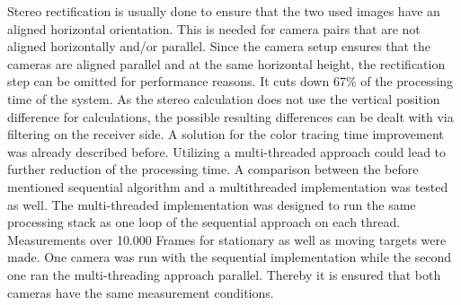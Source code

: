 Stereo rectification is usually done to ensure that the two used images have an aligned horizontal orientation. This is needed for camera pairs that are not aligned horizontally and/or parallel. Since the camera setup ensures that the cameras are aligned parallel and at the same horizontal height, the rectification step can be omitted for performance reasons. It cuts down 67\% of the processing time of the system. As the stereo calculation does not use the vertical position difference for calculations, the possible resulting differences can be dealt with via filtering on the receiver side.
A solution for the color tracing time improvement was already described before. Utilizing a multi-threaded approach could lead to further reduction of the processing time. A comparison between the before mentioned sequential algorithm and a multithreaded implementation was tested as well. The multi-threaded implementation was designed to run the same processing stack as one loop of the sequential approach on each thread. Measurements over 10.000 Frames for stationary as well as moving targets were made. One camera was run with the sequential implementation while the second one ran the multi-threading approach parallel. Thereby it is ensured that both cameras have the same measurement conditions.

